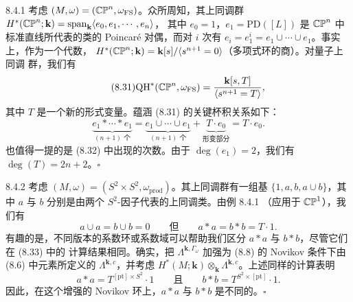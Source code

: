\begin{wexam}{8.4.1}
  考虑 $(M,\omega)=(\mathbb{CP}^n,\omega_{\mathrm{FS}})$。众所周知，其上同调群
  $H^*(\mathbb{CP}^n;\mathbf{k})=\operatorname{span}_{\mathbf{k}}\langle e_0,e_1,\cdots,e_n\rangle$，
  其中 $e_0=1$，$e_1=\mathrm{PD}([L])$ 是 $\mathbb{CP}^n$ 中标准直线所代表的类的 Poincaré 对偶，而对
  $i$ 次有 $e_i=e_1^i=e_1\cup\cdots\cup e_1$。事实上，作为一个代数，
  $H^*(\mathbb{CP}^n;\mathbf{k})=\mathbf{k}[s]/\langle s^{n+1}=0\rangle$（多项式环的商）。对量子上同调
  群，我们有
  \begin{equation}\tag{8.31}
    \mathrm{QH}^*(\mathbb{CP}^n,\omega_{\mathrm{FS}})
      =\frac{\mathbf{k}[s,T]}{\langle s^{n+1}=T\rangle},
  \end{equation}
  其中 $T$ 是一个新的形式变量。蕴涵 (8.31) 的关键杯积关系如下：
  \begin{equation}\tag{8.32}
    \underbrace{e_1*\cdots*e_1}_{(n+1)\text{ 个}}
      =\underbrace{e_1\cup\cdots\cup e_1}_{(n+1)\text{ 个}}
      +\underbrace{T\cdot e_0}_{\text{形变部分}}
      =T\cdot e_0.
  \end{equation}
  也值得一提的是 (8.32) 中出现的次数。由于 $\deg(e_1)=2$，我们有 $\deg(T)=2n+2$。\hfill$\square$
\end{wexam}

\begin{wexam}{8.4.2}
  考虑 $(M,\omega)=(S^2\times S^2,\omega_{\mathrm{prod}})$。其上同调群有一组基
  $\{1,a,b,a\cup b\}$，其中 $a$ 与 $b$ 分别是由两个 $S^2$-因子代表的上同调类。由例 8.4.1
  （应用于 $\mathbb{CP}^1$），我们有
  \begin{equation}\tag{8.33}
    a\cup a=b\cup b=0\qquad\text{但}\qquad a*a=b*b=T\cdot1.
  \end{equation}
  有趣的是，不同版本的系数环或系数域可以帮助我们区分 $a*a$ 与 $b*b$，尽管它们在 (8.33) 中的
  计算结果相同。确实，把 $\Lambda^{\mathbf{k},\Gamma_\omega}$ 加强为 (8.8) 的 Novikov 条件下由
  (8.6) 中元素所定义的 $\Lambda^{\mathbf{k},c}$，并考虑
  $H^*(M;\mathbf{k})\otimes_{\mathbf{k}}\Lambda^{\mathbf{k},c}$。上述同样的计算表明
  \[
    a*a=T^{[\mathrm{pt}]\times S^2}\cdot1
    \qquad\text{且}\qquad
    b*b=T^{S^2\times[\mathrm{pt}]}\cdot1.
  \]
  因此，在这个增强的 Novikov 环上，$a*a$ 与 $b*b$ 是不同的。\hfill$\square$
\end{wexam}

